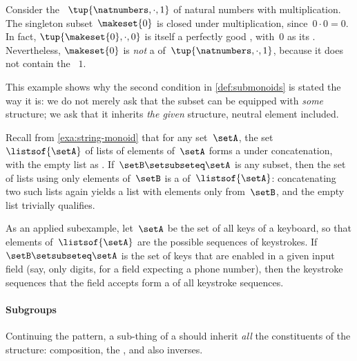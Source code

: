 \begin{example}
    \label{exa:zero-not-submonoid}
    Consider the ~$\tup{\natnumbers, \cdot, 1}$ of natural numbers with multiplication.
    The singleton subset~$\makeset{0}$ is closed under multiplication, since~$0 \cdot 0 = 0$.
    In fact, $\tup{\makeset{0}, \cdot, 0}$ is itself a perfectly good , with~$0$ as its .
    Nevertheless, $\makeset{0}$ is \emph{not} a  of~$\tup{\natnumbers, \cdot, 1}$, because it does not contain the ~$1$.

    This example shows why the second condition in \cref{def:submonoids} is stated the way it is: we do not merely ask that the subset can be equipped with \emph{some}  structure; we ask that it inherits \emph{the given} structure, neutral element included.
\end{example}

\begin{example}
    \label{exa:sub-alphabet-submonoid}
    Recall from \cref{exa:string-monoid} that for any set~$\setA$, the set~$\listsof{\setA}$ of lists of elements of~$\setA$ forms a  under concatenation, with the empty list as .
    If~$\setB \setsubseteq \setA$ is any subset, then the set of lists using only elements of~$\setB$ is a  of~$\listsof{\setA}$: concatenating two such lists again yields a list with elements only from~$\setB$, and the empty list trivially qualifies.

    As an applied subexample, let~$\setA$ be the set of all keys of a keyboard, so that elements of~$\listsof{\setA}$ are the possible sequences of keystrokes.
    If~$\setB \setsubseteq \setA$ is the set of keys that are enabled in a given input field (say, only digits, for a field expecting a phone number), then the keystroke sequences that the field accepts form a  of all keystroke sequences.
\end{example}

\paragraph{Subgroups}

Continuing the pattern, a sub-thing of a  should inherit \emph{all} the constituents of the  structure: composition, the , and also inverses.

